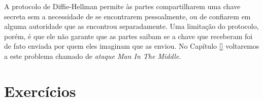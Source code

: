 A protocolo de Diffie-Hellman permite às partes compartilharem uma chave secreta sem a necessidade de se encontrarem pessoalmente, ou de confiarem em alguma autoridade que as encontrou separadamente.
Uma limitação do protocolo, porém, é que ele não garante que as partes saibam se a chave que receberam foi de fato enviada por quem eles imaginam que as enviou.
No Capítulo \ref{} voltaremos a este problema chamado de {\em ataque Man In The Middle}.



\section{Exercícios}
\label{sec:exercicios}



